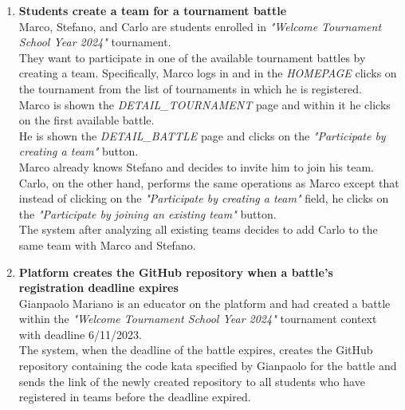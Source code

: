 \begin{enumerate}
	\item \textbf{Students create a team for a tournament battle}\\
	      Marco, Stefano, and Carlo are students enrolled in \emph{"Welcome Tournament School Year 2024"} tournament.\\
	      They want to participate in one of the available tournament battles by creating a team.
	      Specifically, Marco logs in and in the \emph{HOMEPAGE} clicks on the tournament from the list of tournaments in which he is registered.\\
	      Marco is shown the \emph{DETAIL\_TOURNAMENT} page and within it he clicks on the first available battle.\\
	      He is shown the \emph{DETAIL\_BATTLE} page and clicks on the \emph{"Participate by creating a team"} button.\\
	      Marco already knows Stefano and decides to invite him to join his team.\\
	      Carlo, on the other hand, performs the same operations as Marco except that instead of clicking on the \emph{"Participate by creating a team"} field, he clicks on the \emph{"Participate by joining an existing team"} button.\\
	      The system after analyzing all existing teams decides to add Carlo to the same team with Marco and Stefano.

	\item \textbf{Platform creates the GitHub repository when a battle's registration deadline expires}\\
	      Gianpaolo Mariano is an educator on the platform and had created a battle within the \emph{"Welcome Tournament School Year 2024"} tournament context with deadline 6/11/2023.\\
	      The system, when the deadline of the battle expires, creates the GitHub repository containing the code kata specified by Gianpaolo for the battle and sends the link of the newly created repository to all students who have registered in teams before the deadline expired.



\end{enumerate}
